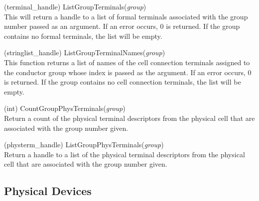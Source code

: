 \begin{description}
\item{(terminal\_handle) \vt ListGroupTerminals({\it group\/})}\\
This will return a handle to a list of formal terminals associated
with the group number passed as an argument.  If an error occurs, 0 is
returned.  If the group contains no formal terminals, the list will be
empty.

\item{(stringlist\_handle) \vt ListGroupTerminalNames({\it group\/})}\\
This function returns a list of names of the cell connection terminals
assigned to the conductor group whose index is passed as the argument. 
If an error occurs, 0 is returned.  If the group contains no cell
connection terminals, the list will be empty.

\item{(int) \vt CountGroupPhysTerminals({\it group\/})}\\
Return a count of the physical terminal descriptors from the
physical cell that are associated with the group number given.

\item{(physterm\_handle) \vt ListGroupPhysTerminals({\it group\/})}\\
Return a handle to a list of the physical terminal descriptors from
the physical cell that are associated with the group number given.

\end{description}


\subsection{Physical Devices}

